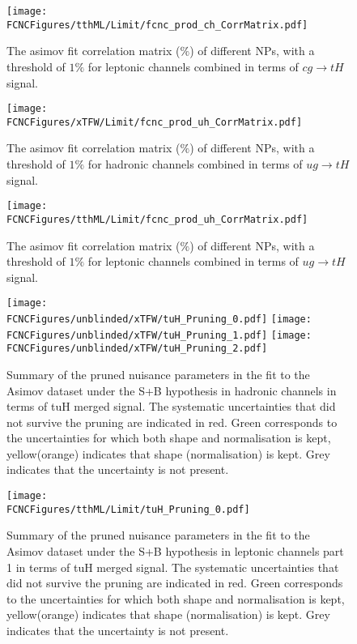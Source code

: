\begin{figure}[H]
\centering
\texttt{[image: \\FCNCFigures/tthML/Limit/fcnc\_prod\_ch\_CorrMatrix.pdf]}
\caption{ The asimov fit correlation matrix ($\%$) of different NPs, with a threshold of $1\%$ for leptonic channels combined in terms of $cg\to tH$ signal.}
\label{fig:fcnc_prod_ch_CorrMatrix_2}
\end{figure}

\begin{figure}[H]
\centering
\texttt{[image: \\FCNCFigures/xTFW/Limit/fcnc\_prod\_uh\_CorrMatrix.pdf]}
\caption{ The asimov fit correlation matrix ($\%$) of different NPs, with a threshold of $1\%$ for hadronic channels combined in terms of $ug\to tH$ signal.}
\label{fig:fcnc_prod_uh_CorrMatrix_1}
\end{figure}

\begin{figure}[H]
\centering
\texttt{[image: \\FCNCFigures/tthML/Limit/fcnc\_prod\_uh\_CorrMatrix.pdf]}
\caption{ The asimov fit correlation matrix ($\%$) of different NPs, with a threshold of $1\%$ for leptonic channels combined in terms of $ug\to tH$ signal.}
\label{fig:fcnc_prod_uh_CorrMatrix_2}
\end{figure}


\begin{figure}[H]
\centering
\texttt{[image: \\FCNCFigures/unblinded/xTFW/tuH\_Pruning\_0.pdf]}
\texttt{[image: \\FCNCFigures/unblinded/xTFW/tuH\_Pruning\_1.pdf]}
\texttt{[image: \\FCNCFigures/unblinded/xTFW/tuH\_Pruning\_2.pdf]}
\caption{ Summary of the pruned nuisance parameters in the fit to the  Asimov dataset under the S+B hypothesis in hadronic channels in terms of tuH merged signal. The systematic uncertainties that did not survive the pruning are indicated in red. Green corresponds to the uncertainties for which both shape and normalisation is kept, yellow(orange) indicates that shape (normalisation) is kept. Grey indicates that the uncertainty is not present.}
\label{fig:xTFW_pruning_0}
\end{figure}

\begin{figure}[H]
\centering
\texttt{[image: \\FCNCFigures/tthML/Limit/tuH\_Pruning\_0.pdf]}
\caption{ Summary of the pruned nuisance parameters in the fit to the  Asimov dataset under the S+B hypothesis in leptonic channels part 1 in terms of tuH merged signal. The systematic uncertainties that did not survive the pruning are indicated in red. Green corresponds to the uncertainties for which both shape and normalisation is kept, yellow(orange) indicates that shape (normalisation) is kept. Grey indicates that the uncertainty is not present.}
\label{fig:tthML_pruning_0}
\end{figure}


